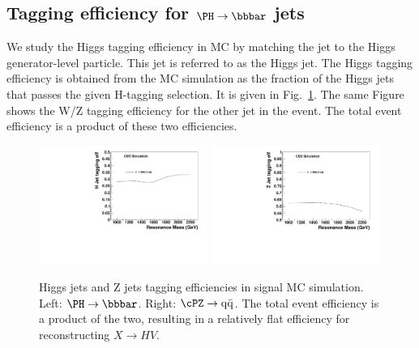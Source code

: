 





\subsection{Tagging efficiency for $\Hbb$ jets}


We study the Higgs tagging efficiency in MC by matching the jet to the Higgs 
generator-level particle.  This jet is referred to as the Higgs jet. 
The Higgs tagging efficiency is obtained from the MC simulation as the
fraction of the Higgs jets that passes the given H-tagging selection.
It is given in Fig.~\ref{fig:HEff}.  The same Figure shows the
W/Z tagging efficiency for the other jet in the event.  The total
event efficiency is a product of these two efficiencies.  

\begin{figure}[htb]
\begin{center}
\includegraphics[width=0.49\textwidth]{EXO-14-009/HbbZqqfigs/Signal/H-taggingEff-8TeV.pdf}
\includegraphics[width=0.49\textwidth]{EXO-14-009/HbbZqqfigs/Signal/Z-taggingEff-8TeV.pdf}
\end{center}
\caption{
  Higgs jets and Z jets tagging efficiencies in signal MC simulation.
  Left: $\Hbb$. Right: $\Zqq$.  The total event efficiency is a product
  of the two, resulting in a relatively flat efficiency for reconstructing
  $X \to HV$.
}
\label{fig:HEff}
\end{figure}


